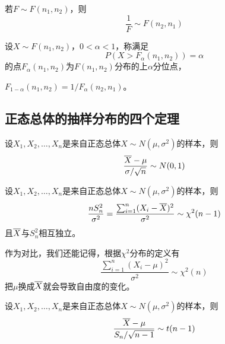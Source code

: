 \begin{theorem}[$F$分布的性质]
  若$F\sim F(n_1,n_2)$，则
  \begin{displaymath}
    \frac{1}{F} \sim F(n_2,n_1)
  \end{displaymath}
\end{theorem}

\begin{definition}
  设$X\sim F(n_1,n_2)$，$0<\alpha<1$，称满足
  \begin{displaymath}
    P(X>F_\alpha(n_1,n_2)) = \alpha
  \end{displaymath}
  的点$F_\alpha(n_1,n_2)$为$F(n_1,n_2)$分布的上$\alpha$分位点，
\end{definition}

\begin{theorem}
  $F_{1-\alpha}(n_1,n_2) = 1/F_\alpha(n_2,n_1)$。
\end{theorem}

\subsection{正态总体的抽样分布的四个定理}
\begin{theorem}[样本均值的分布]
  设$X_1,X_2,\dots,X_n$是来自正态总体$X\sim N(\mu,\sigma^2)$的样本，则
  \begin{displaymath}
    \frac{\overline{X}-\mu}{\sigma/\sqrt{n}}\sim N(0,1)
  \end{displaymath}
\end{theorem}

\begin{theorem}[样本方差的分布]
  设$X_1,X_2,\dots,X_n$是来自正态总体$X\sim N(\mu,\sigma^2)$的样本，则
  \begin{displaymath}
    \frac{nS_n^2}{\sigma^2} =
    \frac{\sum_{i=1}^n(X_i-\overline{X})^2}{\sigma^2} \sim \chi^2(n-1)
  \end{displaymath}
  且$\overline{X}$与$S_n^2$相互独立。
\end{theorem}

\begin{remark}
  作为对比，我们还能记得，根据$\chi^2$分布的定义有
  \begin{displaymath}
    \frac{\sum_{i=1}^n(X_i-\mu)^2}{\sigma^2} \sim \chi^2(n)
  \end{displaymath}
  把$\mu$换成$\overline{X}$就会导致自由度的变化。
\end{remark}

\begin{theorem}[样本均值和样本方差的分布]
  设$X_1,X_2,\dots,X_n$是来自正态总体$X\sim N(\mu,\sigma^2)$的样本，则
  \begin{displaymath}
    \frac{\overline{X}-\mu}{S_n/\sqrt{n-1}}\sim t(n-1)
  \end{displaymath}
\end{theorem}

